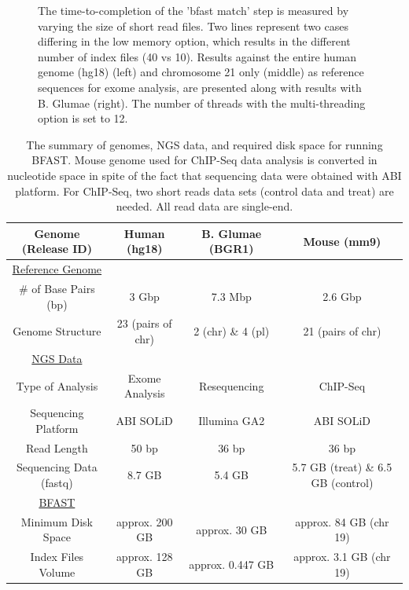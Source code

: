 \documentclass{cpeauth}
\begin{document}
\begin{figure}
\caption{\small The time-to-completion of the 'bfast match' step is
  measured by varying the size of short read files.  Two lines
  represent two cases differing in the low memory option, which
  results in the different number of index files (40 vs 10).  Results
  against the entire human genome (hg18) (left) and chromosome 21
  only (middle) as reference sequences for exome analysis, are
  presented along with results with B. Glumae (right).  The number of
  threads with the multi-threading option is set to 12. }
  \label{fig:parallel-execution} 
 \end{figure}




\begin{table}
\small
\begin{tabular}{|c|c|c|c|} 
  \hline 
Genome (Release ID)   & Human (hg18) & B. Glumae (BGR1) & Mouse (mm9)  \\    
   
\hline \hline
\underline{Reference Genome} & & & \\
    \# of Base Pairs (bp) &  3 Gbp & 7.3 Mbp & 2.6 Gbp\\ 
   Genome Structure &   23 (pairs of chr)  & 2 (chr) \& 4 (pl) & 21 (pairs of chr)   \\   
 
      \hline \hline
  \underline{NGS Data} & &   & \\
      Type of  Analysis &  Exome Analysis &  Resequencing & ChIP-Seq\\ 
  
          Sequencing Platform & ABI SOLiD  &  Illumina GA2 & ABI SOLiD \\ 
          Read Length & 50 bp & 36 bp & 36 bp \\

  Sequencing Data (fastq)  & 8.7 GB & 5.4 GB & 5.7 GB (treat) \& 6.5 GB (control) \\
  
  
  \hline  \hline
  \underline{BFAST} & &  & \\
  Minimum Disk Space &  approx. 200 GB   &    approx. 30 GB  &  approx. 84 GB (chr 19)\\
   Index Files Volume  & approx. 128 GB  & approx. 0.447 GB  & approx. 3.1 GB (chr 19)\\ 
\hline  \hline
\end{tabular} \caption{The summary of genomes, NGS data, and required disk space for running BFAST.  Mouse genome used for ChIP-Seq data analysis is converted in nucleotide space in spite of the fact that sequencing data were obtained with ABI platform.  For ChIP-Seq, two short reads data sets (control data and treat) are needed.  All read data are single-end.}
 \label{table:two-genomes} 
\end{table}
\end{document}
